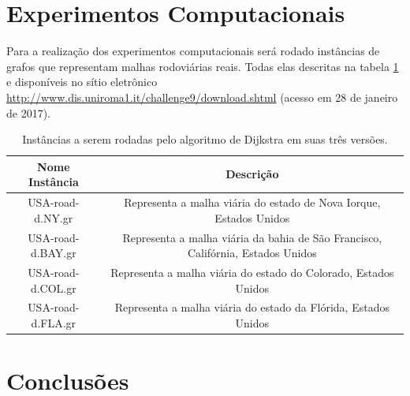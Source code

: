\section{Experimentos Computacionais}
\label{sec-dijkstra-experimentos}
Para a realização dos experimentos computacionais será rodado instâncias de grafos que representam malhas rodoviárias reais. Todas elas descritas na tabela \ref{tbl-dijkstra-instancias} e disponíveis no sítio eletrônico \url{http://www.dis.uniroma1.it/challenge9/download.shtml} (acesso em 28 de janeiro de 2017).
\begin{table}[H]
\caption{Instâncias a serem rodadas pelo algoritmo de Dijkstra em suas três versões.}
\label{tbl-dijkstra-instancias}
\centering
\begin{adjustbox}{max width=\textwidth}
\begin{tabular}{|c|c|}
\hline 
\textbf{Nome Instância} & \textbf{Descrição} \\ 
\hline 
USA-road-d.NY.gr & Representa a malha viária do estado de Nova Iorque, Estados Unidos \\ 
\hline 
USA-road-d.BAY.gr & Representa a malha viária da bahia de São Francisco, Califórnia, Estados Unidos \\ 
\hline 
USA-road-d.COL.gr & Representa a malha viária do estado do Colorado, Estados Unidos \\ 
\hline 
USA-road-d.FLA.gr & Representa a malha viária do estado da Flórida, Estados Unidos \\ 
\hline 
\end{tabular}
\end{adjustbox}
\end{table}
\section{Conclusões}
\label{sec-dijkstra-conclusoes}